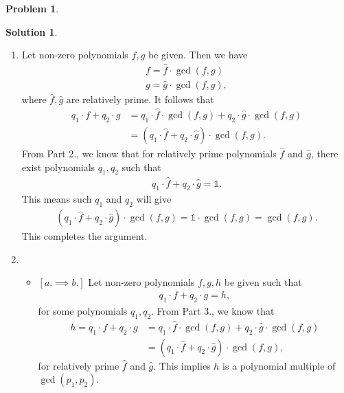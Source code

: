 \documentclass{book}
\theoremstyle{definition}
\newtheorem*{prob*}{Problem}
\newtheorem*{sln*}{Solution}
\begin{document}
\begin{prob*}
\begin{sln*}
\begin{enumerate}
	\item Let non-zero polynomials $f,g$ be given. Then we have
	\begin{align*}
	f = \hat{f}\cdot \gcd(f,g)\\
	g = \hat{g}\cdot \gcd(f,g),
	\end{align*}
	where $\hat{f}, \hat{g}$ are relatively prime. It follows that
	\begin{align*}
	q_1 \cdot f + q_2 \cdot g &= q_1 \cdot \hat{f}\cdot \gcd(f,g) + q_2 \cdot \hat{g}\cdot \gcd(f,g)\\
	&= (q_1 \cdot \hat{f} + q_2 \cdot \hat{g})\cdot \gcd(f,g).
	\end{align*}
	From Part 2., we know that for relatively prime polynomials $\hat{f}$ and $\hat{g}$, there exist polynomials $q_1, q_2$ such that
	\begin{align*}
	q_1 \cdot \hat{f} + q_2 \cdot \hat{g} = \mathbb{1}.
	\end{align*}
	This means such $q_1$ and $q_2$ will give
	\begin{align*}
	(q_1 \cdot \hat{f} + q_2 \cdot \hat{g})\cdot \gcd(f,g) = \mathbb{1}\cdot\gcd(f,g) = \gcd(f,g).
	\end{align*}
	This completes the argument.\\
	
	
	\item \begin{itemize}
		\item $[a.\implies b.]$ Let non-zero polynomials $f,g,h$ be given such that
		\begin{align*}
		q_1 \cdot f + q_2 \cdot g = h,
		\end{align*}
		for some polynomials $q_1, q_2$. From Part 3., we know that 
		\begin{align*}
		h = q_1 \cdot f + q_2 \cdot g &= q_1 \cdot \hat{f}\cdot \gcd(f,g) + q_2 \cdot \hat{g}\cdot \gcd(f,g)\\
		&= (q_1 \cdot \hat{f} + q_2 \cdot \hat{g})\cdot \gcd(f,g),
		\end{align*}
		for relatively prime $\hat{f}$ and $\hat{g}$. This implies $h$ is a polynomial multiple of $\gcd(p_1,p_2)$. \\
		

\end{itemize}
\end{enumerate}
\end{sln*}
\end{prob*}
\end{document}

